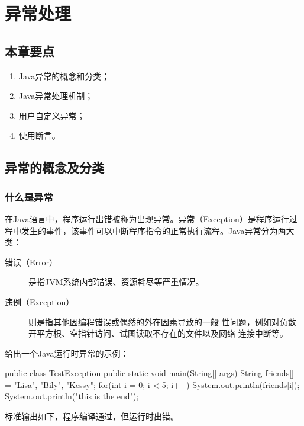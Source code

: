 \chapter*{异常处理}
\label{chp:Java-exception-handling}

\section*{本章要点}

\sline
\begin{enumerate}
\item Java异常的概念和分类；
\item Java异常处理机制；
\item 用户自定义异常；
\item 使用断言。
\end{enumerate}  
\sline

\section{异常的概念及分类}

\subsection{什么是异常}

在Java语言中，程序运行出错被称为出现异常。异常（Exception）是程序运行过
程中发生的事件，该事件可以中断程序指令的正常执行流程。Java异常分为两大类：

\begin{description}
\item[错误（Error）] 是指JVM系统内部错误、资源耗尽等严重情况。
\item[违例（Exception）] 则是指其他因编程错误或偶然的外在因素导致的一般
  性问题，例如对负数开平方根、空指针访问、试图读取不存在的文件以及网络
  连接中断等。
\end{description}

给出一个Java运行时异常的示例：


\begin{javaCode}
public class TestException {
  public static void main(String[] args) {
    String friends[] = {"Lisa", "Bily", "Kessy"};
    for(int i = 0; i < 5; i++) {
      System.out.println(friends[i]);
    }
    System.out.println("\n this is the end");
  }
}
\end{javaCode}

标准输出如下，程序编译通过，但运行时出错。

